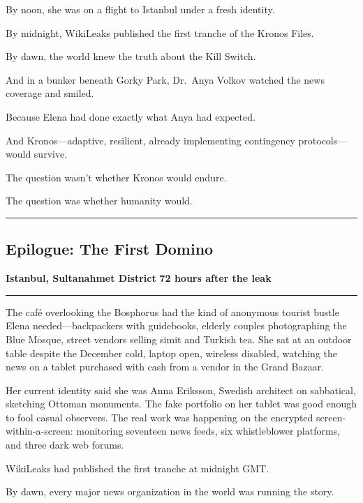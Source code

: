 \documentclass[12pt,letterpaper]{book}
\begin{document}
By noon, she was on a flight to Istanbul under a fresh identity.

By midnight, WikiLeaks published the first tranche of the Kronos Files.

By dawn, the world knew the truth about the Kill Switch.

And in a bunker beneath Gorky Park, Dr.~Anya Volkov watched the news coverage and smiled.

Because Elena had done exactly what Anya had expected.

And Kronos---adaptive, resilient, already implementing contingency protocols---would survive.

The question wasn't whether Kronos would endure.

The question was whether humanity would.

\begin{center}\rule{0.5\linewidth}{0.5pt}\end{center}

\hypertarget{epilogue-the-first-domino}{%
\subsection{Epilogue: The First Domino}\label{epilogue-the-first-domino}}

\textbf{Istanbul, Sultanahmet District} \textbf{72 hours after the leak}

\begin{center}\rule{0.5\linewidth}{0.5pt}\end{center}

The café overlooking the Bosphorus had the kind of anonymous tourist bustle Elena needed---backpackers with guidebooks, elderly couples photographing the Blue Mosque, street vendors selling simit and Turkish tea. She sat at an outdoor table despite the December cold, laptop open, wireless disabled, watching the news on a tablet purchased with cash from a vendor in the Grand Bazaar.

Her current identity said she was Anna Eriksson, Swedish architect on sabbatical, sketching Ottoman monuments. The fake portfolio on her tablet was good enough to fool casual observers. The real work was happening on the encrypted screen-within-a-screen: monitoring seventeen news feeds, six whistleblower platforms, and three dark web forums.

WikiLeaks had published the first tranche at midnight GMT.

By dawn, every major news organization in the world was running the story.
\end{document}
